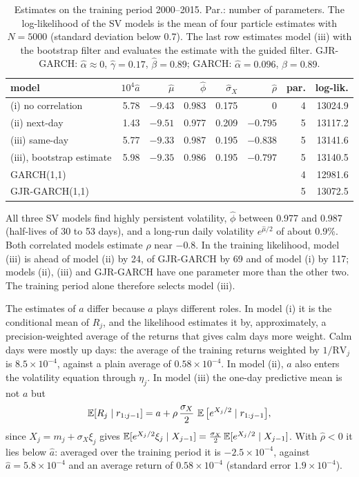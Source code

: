 \begin{table}[t]
        \centering
        \small
        \caption{Estimates on the training period 2000--2015. Par.: number of parameters. The log-likelihood of the SV models is the mean of four particle estimates with $N = 5000$ (standard deviation below 0.7). The last row estimates model (iii) with the bootstrap filter and evaluates the estimate with the guided filter. GJR-GARCH: $\hat\alpha \approx 0$, $\hat\gamma = 0.17$, $\hat\beta = 0.89$; GARCH: $\hat\alpha = 0.096$, $\hat\beta = 0.89$.}
        \label{tab:est}
        \begin{tabular}{lrrrrrrr}
                \toprule
                model & $10^4\hat a$ & $\hat\mu$ & $\hat\phi$ & $\hat\sigma_X$ & $\hat\rho$ & par. & log-lik. \\
                \midrule
                (i) no correlation & 5.78 & $-9.43$ & 0.983 & 0.175 & 0 & 4 & 13024.9 \\
                (ii) next-day & 1.43 & $-9.51$ & 0.977 & 0.209 & $-0.795$ & 5 & 13117.2 \\
                (iii) same-day & 5.77 & $-9.33$ & 0.987 & 0.195 & $-0.838$ & 5 & 13141.6 \\
                (iii), bootstrap estimate & 5.98 & $-9.35$ & 0.986 & 0.195 & $-0.797$ & 5 & 13140.5 \\
                GARCH(1,1) & & & & & & 4 & 12981.6 \\
                GJR-GARCH(1,1) & & & & & & 5 & 13072.5 \\
                \bottomrule
        \end{tabular}
\end{table}

All three SV models find highly persistent volatility, $\hat\phi$ between 0.977 and 0.987 (half-lives of 30 to 53 days), and a long-run daily volatility $e^{\hat\mu/2}$ of about 0.9\%. Both correlated models estimate $\rho$ near $-0.8$. In the training likelihood, model (iii) is ahead of model (ii) by 24, of GJR-GARCH by 69 and of model (i) by 117; models (ii), (iii) and GJR-GARCH have one parameter more than the other two. The training period alone therefore selects model (iii).

The estimates of $a$ differ because $a$ plays different roles. In model (i) it is the conditional mean of $R_j$, and the likelihood estimates it by, approximately, a precision-weighted average of the returns that gives calm days more weight. Calm days were mostly up days: the average of the training returns weighted by $1/\mathrm{RV}_j$ is $8.5 \times 10^{-4}$, against a plain average of $0.58 \times 10^{-4}$. In model (ii), $a$ also enters the volatility equation through $\eta_j$. In model (iii) the one-day predictive mean is not $a$ but
\[
        \operatorname{\mathbb{E}}[R_j \mid r_{1:j-1}] = a + \rho\,\frac{\sigma_X}{2}\,\operatorname{\mathbb{E}}\big[e^{X_j/2} \mid r_{1:j-1}\big],
\]
since $X_j = m_j + \sigma_X\xi_j$ gives $\operatorname{\mathbb{E}}[e^{X_j/2}\xi_j \mid X_{j-1}] = \frac{\sigma_X}{2}\operatorname{\mathbb{E}}[e^{X_j/2} \mid X_{j-1}]$. With $\hat\rho < 0$ it lies below $\hat a$: averaged over the training period it is $-2.5 \times 10^{-4}$, against $\hat a = 5.8 \times 10^{-4}$ and an average return of $0.58 \times 10^{-4}$ (standard error $1.9 \times 10^{-4}$).

